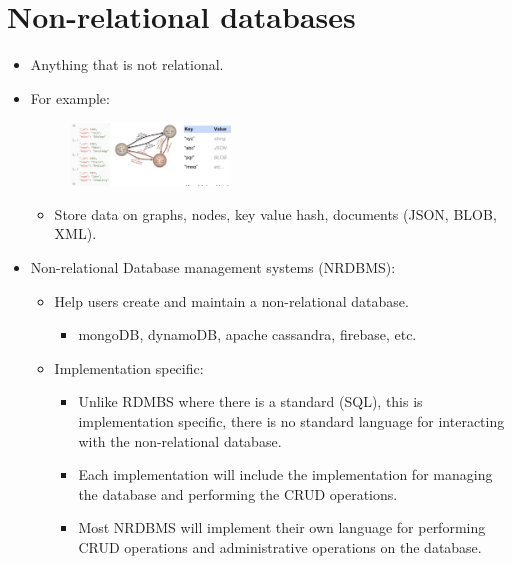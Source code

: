\section{Non-relational databases}
\begin{itemize}
    \item Anything that is not relational.
    \item For example: 
        \begin{figure}[H]
            \centering
            \includegraphics[width=0.4\textwidth]{./figs/nonrelational.png}
        \end{figure}
        \begin{itemize}
            \item Store data on graphs, nodes, key value hash, documents (JSON, BLOB, XML).
        \end{itemize}
    
    \item Non-relational Database management systems (NRDBMS):
        \begin{itemize}
            \item Help users create and maintain a non-relational database.
                \begin{itemize}
                    \item mongoDB, dynamoDB, apache cassandra, firebase, etc.
                \end{itemize}
            
            \item Implementation specific:
                \begin{itemize}
                    \item Unlike RDMBS where there is a standard (SQL), this is implementation specific, there is no standard language for interacting with the non-relational database. 
                    \item Each implementation will include the implementation for managing the database and performing the CRUD operations.
                    \item Most NRDBMS will implement their own language for performing CRUD operations and administrative operations on the database.
                \end{itemize}
        \end{itemize}
\end{itemize}

